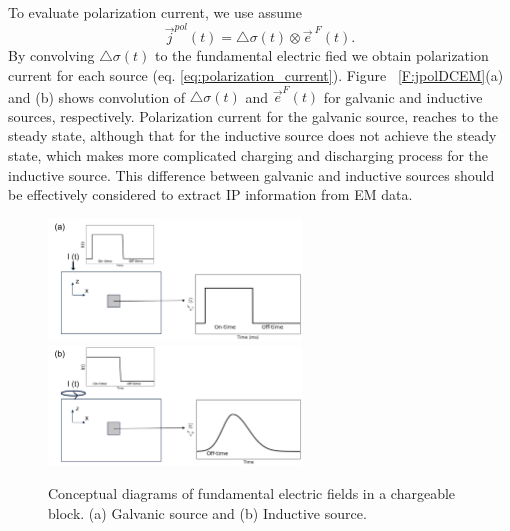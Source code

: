\documentclass[letterpaper,11pt]{article}
\newcommand{\dsig}{\triangle\sigma}
\renewcommand {\j}  { {\vec j} }
\newcommand {\e}  { {\vec e} }
\begin{document}
To evaluate polarization current, we use assume
\begin{equation}
  \j^{pol}(t) = \dsig(t)\otimes \e^{\ F}(t).
\end{equation}
By convolving $\dsig(t)$ to the fundamental electric fied we obtain polarization current for each source (eq. \ref{eq:polarization_current}). Figure ~\ref{F:jpolDCEM}(a) and (b) shows convolution of $\dsig(t)$ and $\e^F(t)$ for galvanic and inductive sources, respectively. 
Polarization current for the galvanic source, reaches to the steady state, although that for the inductive source does not achieve the steady state, which makes more complicated charging and discharging process for the inductive source. This difference between galvanic and inductive sources should be effectively considered to extract IP information from EM data. 

\begin{figure}  
  \centering
  \includegraphics[width=0.6\textwidth]{figures/chargDC.png} \\
  \includegraphics[width=0.6\textwidth]{figures/chargAC.png} 
  \caption{Conceptual diagrams of fundamental electric fields in a chargeable block. (a) Galvanic source and (b) Inductive source. }
  \label{F:ChargConcept}
\end{figure}   
\end{document}
